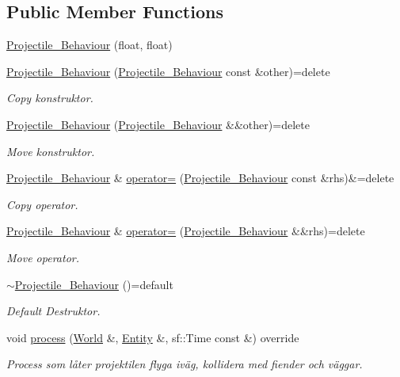 \subsection*{Public Member Functions}
\begin{DoxyCompactItemize}
\item 
\hyperlink{classProjectile__Behaviour_a460172a4c8d52af1dc55f1eb7f624ef1}{Projectile\+\_\+\+Behaviour} (float, float)
\item 
\hyperlink{classProjectile__Behaviour_a0c1dc1a0ad304692db0c088e51b0f19c}{Projectile\+\_\+\+Behaviour} (\hyperlink{classProjectile__Behaviour}{Projectile\+\_\+\+Behaviour} const \&other)=delete
\begin{DoxyCompactList}\small\item\em Copy konstruktor. \end{DoxyCompactList}\item 
\hyperlink{classProjectile__Behaviour_aee521a8bd5d09005746ee0e9042137de}{Projectile\+\_\+\+Behaviour} (\hyperlink{classProjectile__Behaviour}{Projectile\+\_\+\+Behaviour} \&\&other)=delete
\begin{DoxyCompactList}\small\item\em Move konstruktor. \end{DoxyCompactList}\item 
\hyperlink{classProjectile__Behaviour}{Projectile\+\_\+\+Behaviour} \& \hyperlink{classProjectile__Behaviour_ae45e301589b2c50eef8de0b9ea5e71b0}{operator=} (\hyperlink{classProjectile__Behaviour}{Projectile\+\_\+\+Behaviour} const \&rhs)\&=delete
\begin{DoxyCompactList}\small\item\em Copy operator. \end{DoxyCompactList}\item 
\hyperlink{classProjectile__Behaviour}{Projectile\+\_\+\+Behaviour} \& \hyperlink{classProjectile__Behaviour_a1e3c2f59645bec71a85d0d2689782006}{operator=} (\hyperlink{classProjectile__Behaviour}{Projectile\+\_\+\+Behaviour} \&\&rhs)=delete
\begin{DoxyCompactList}\small\item\em Move operator. \end{DoxyCompactList}\item 
\hyperlink{classProjectile__Behaviour_a162b3629a2d387c82f8f7365b0ee271e}{$\sim$\+Projectile\+\_\+\+Behaviour} ()=default
\begin{DoxyCompactList}\small\item\em Default Destruktor. \end{DoxyCompactList}\item 
void \hyperlink{classProjectile__Behaviour_aed04c8c1f5ae6aca08bdf05b6248d24a}{process} (\hyperlink{classWorld}{World} \&, \hyperlink{classEntity}{Entity} \&, sf\+::\+Time const \&) override
\begin{DoxyCompactList}\small\item\em Process som låter projektilen flyga iväg, kollidera med fiender och väggar. \end{DoxyCompactList}\end{DoxyCompactItemize}
